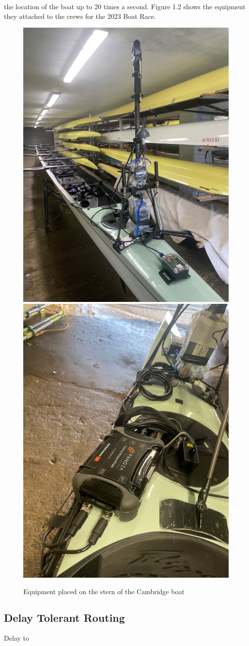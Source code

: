 \documentclass[12pt,a4paper]{report}
\begin{document}
 the location of the boat up to 20 times a second. Figure 1.2 shows the equipment they attached to the crews for the 2023 Boat Race.  
\begin{figure}[h]
\begin{center}
\includegraphics[scale=0.07]{boatrace1.jpg}           \includegraphics[scale=0.07]{boatrace2.jpg}
\end{center}
\caption{Equipment placed on the stern of the Cambridge boat \cite{mike}}
\end{figure}
\FloatBarrier

\subsection{Delay Tolerant Routing}
Delay to
\end{document}
